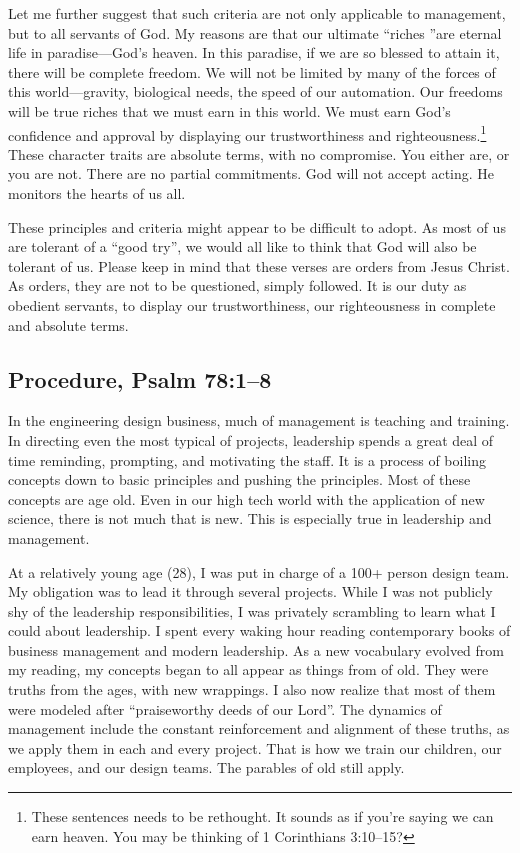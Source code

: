 \documentclass[12pt]{memoir}
\begin{document}
Let me further suggest that such criteria are not only applicable
to management, but to all servants of God. My reasons are that our
ultimate ``riches ''are eternal life in paradise---God's heaven.
In this paradise, if we are so blessed to attain it, there will be
complete freedom. We will not be limited by many of the forces of
this world---gravity, biological needs, the speed of our automation.
Our freedoms will be true riches that we must earn in this world.
We must earn God's confidence and approval by displaying our trustworthiness
and righteousness.\footnote{These sentences needs to be rethought. It sounds as if you're saying we can earn heaven. You may be thinking of 1 Corinthians 3:10--15?} These character traits are absolute terms, with
no compromise. You either are, or you are not. There are no partial
commitments. God will not accept acting. He monitors the hearts of
us all.

These principles and criteria might appear to be difficult to adopt.
As most of us are tolerant of a ``good try'', we would all like
to think that God will also be tolerant of us. Please keep in mind
that these verses are orders from Jesus Christ. As orders, they
are not to be questioned, simply followed. It is our duty as obedient
servants, to display our trustworthiness, our righteousness in complete
and absolute terms.

\subsection[Procedure]{Procedure, Psalm 78:1--8}
In the engineering design business, much of management is teaching and training. In directing even the most typical of projects, leadership spends a great deal of time reminding, prompting, and motivating the
staff. It is a process of boiling concepts down to basic principles
and pushing the principles. Most of these concepts are age old.
Even in our high tech world with the application of new science, there is not much that is new. This is especially true in leadership
and management. 

At a relatively young age (28), I was put in charge of a 100+ person
design team. My obligation was to lead it through several projects.
While I was not publicly shy of the leadership responsibilities, I
was privately scrambling to learn what I could about leadership. I spent
every waking hour reading contemporary books of business management
and modern leadership. As a new vocabulary evolved from my reading,
my concepts began to all appear as things from of old. They were truths
from the ages, with new wrappings. I also now realize that most of
them were modeled after ``praiseworthy deeds of our Lord''. The
dynamics of management include the constant reinforcement and alignment
of these truths, as we apply them in each and every project. That
is how we train our children, our employees, and our design teams.
The parables of old still apply. 
\end{document}
